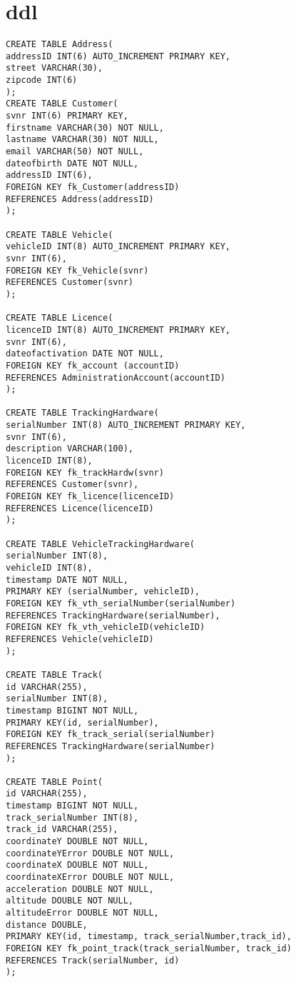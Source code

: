 \section{\gls{ddl}}
\begin{verbatim}
CREATE TABLE Address(
addressID INT(6) AUTO_INCREMENT PRIMARY KEY,
street VARCHAR(30),
zipcode INT(6)
);
CREATE TABLE Customer(
svnr INT(6) PRIMARY KEY,
firstname VARCHAR(30) NOT NULL,
lastname VARCHAR(30) NOT NULL,
email VARCHAR(50) NOT NULL,
dateofbirth DATE NOT NULL,
addressID INT(6),
FOREIGN KEY fk_Customer(addressID)
REFERENCES Address(addressID)
);

CREATE TABLE Vehicle(
vehicleID INT(8) AUTO_INCREMENT PRIMARY KEY,
svnr INT(6),
FOREIGN KEY fk_Vehicle(svnr)
REFERENCES Customer(svnr)
);

CREATE TABLE Licence(
licenceID INT(8) AUTO_INCREMENT PRIMARY KEY,
svnr INT(6),
dateofactivation DATE NOT NULL,
FOREIGN KEY fk_account (accountID)
REFERENCES AdministrationAccount(accountID)
);

CREATE TABLE TrackingHardware(
serialNumber INT(8) AUTO_INCREMENT PRIMARY KEY,
svnr INT(6),
description VARCHAR(100),
licenceID INT(8),
FOREIGN KEY fk_trackHardw(svnr)
REFERENCES Customer(svnr),
FOREIGN KEY fk_licence(licenceID)
REFERENCES Licence(licenceID)
);

CREATE TABLE VehicleTrackingHardware(
serialNumber INT(8),
vehicleID INT(8),
timestamp DATE NOT NULL,
PRIMARY KEY (serialNumber, vehicleID),
FOREIGN KEY fk_vth_serialNumber(serialNumber)
REFERENCES TrackingHardware(serialNumber),
FOREIGN KEY fk_vth_vehicleID(vehicleID)
REFERENCES Vehicle(vehicleID)
);

CREATE TABLE Track(
id VARCHAR(255),
serialNumber INT(8),
timestamp BIGINT NOT NULL,
PRIMARY KEY(id, serialNumber),
FOREIGN KEY fk_track_serial(serialNumber)
REFERENCES TrackingHardware(serialNumber)
);

CREATE TABLE Point(
id VARCHAR(255),
timestamp BIGINT NOT NULL,
track_serialNumber INT(8),
track_id VARCHAR(255),
coordinateY DOUBLE NOT NULL,
coordinateYError DOUBLE NOT NULL,
coordinateX DOUBLE NOT NULL,
coordinateXError DOUBLE NOT NULL,
acceleration DOUBLE NOT NULL,
altitude DOUBLE NOT NULL,
altitudeError DOUBLE NOT NULL,
distance DOUBLE,
PRIMARY KEY(id, timestamp, track_serialNumber,track_id),
FOREIGN KEY fk_point_track(track_serialNumber, track_id)
REFERENCES Track(serialNumber, id)
);
\end{verbatim}
